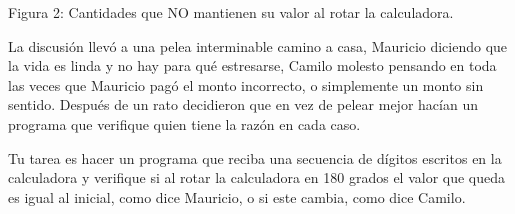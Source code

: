 \documentclass{oci}
\begin{document}
\begin{problemDescription}
\bigskip
\bigskip

\begin{center}
\resizebox{!}{40pt}{} \hspace*{50pt}  
\resizebox{!}{40pt}{} \hspace*{50pt}  
\resizebox{!}{40pt}{}\bigskip

{Figura 2: Cantidades que NO mantienen su valor al rotar la calculadora.}
\end{center}

\bigskip
\bigskip


La discusión llevó a una pelea interminable camino a casa, Mauricio diciendo que
la vida es linda y no hay para qué estresarse, Camilo molesto pensando en toda
las veces que Mauricio pagó el monto incorrecto, o simplemente un monto sin
sentido.
Después de un rato decidieron que en vez de pelear mejor hacían un programa que
verifique quien tiene la razón en cada caso.

Tu tarea es hacer un programa que reciba una secuencia de dígitos escritos
en la calculadora y verifique si al rotar la calculadora en 180
grados el valor que queda es igual al inicial, como dice Mauricio, o si
este cambia, como dice Camilo.

  
%

%
%

\end{problemDescription}
\end{document}
